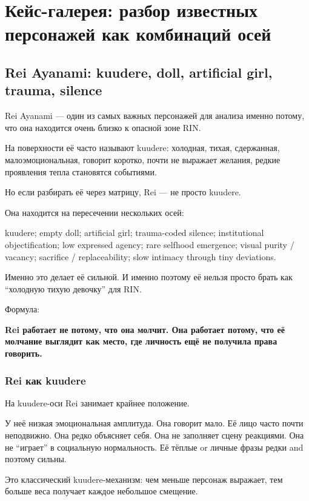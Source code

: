 \setcounter{chapter}{10}
\chapter{Кейс-галерея: разбор известных персонажей как комбинаций осей}

\setcounter{section}{0}
\section{Rei Ayanami: kuudere, doll, artificial girl, trauma, silence}

Rei Ayanami --- один из самых важных персонажей для анализа именно
потому, что она находится очень близко к опасной зоне RIN.

На поверхности её часто называют kuudere: холодная, тихая, сдержанная,
малоэмоциональная, говорит коротко, почти не выражает желания, редкие
проявления тепла становятся событиями.

Но если разбирать её через матрицу, Rei --- не просто kuudere.

Она находится на пересечении нескольких осей:

kuudere; empty doll; artificial girl; trauma-coded silence;
institutional objectification; low expressed agency; rare selfhood
emergence; visual purity /\hspace{0pt} vacancy; sacrifice /\hspace{0pt} replaceability; slow
intimacy through tiny deviations.

Именно это делает её сильной. И именно поэтому её нельзя просто брать
как ``холодную тихую девочку'' для RIN.

Формула:

\textbf{Rei работает не потому, что она молчит. Она работает потому, что
её молчание выглядит как место, где личность ещё не получила права
говорить.}

\subsection*{Rei как kuudere}

На kuudere-оси Rei занимает крайнее положение.

У неё низкая эмоциональная амплитуда. Она говорит мало. Её лицо часто
почти неподвижно. Она редко объясняет себя. Она не заполняет сцену
реакциями. Она не ``играет'' в социальную нормальность. Её тёплые or
личные фразы редки and поэтому сильны.

Это классический kuudere-механизм: чем меньше персонаж выражает, тем
больше веса получает каждое небольшое смещение.

